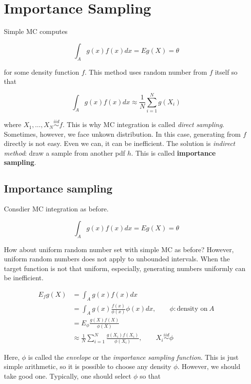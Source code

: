 \documentclass[]{book}
\theoremstyle{definition}
\theoremstyle{definition}
\theoremstyle{definition}
\theoremstyle{remark}
\begin{document}
\hypertarget{importance-sampling}{%
\section{Importance Sampling}\label{importance-sampling}}

Simple MC computes

\[\int_A g(x) f(x) dx = E g(X) = \theta\]

for some density function \(f\). This method uses random number from \(f\) itself so that

\[\int_A g(x) f(x) dx \approx \frac{1}{N} \sum_{i = 1}^N g(X_i)\]

where \(X_1, \ldots, X_N \stackrel{iid}{\sim}f\). This is why MC integration is called \emph{direct sampling}. Sometimes, however, we face unkown distribution. In this case, generating from \(f\) directly is not easy. Even we can, it can be inefficient. The solution is \emph{indirect method}: draw a sample from another pdf \(h\). This is called \textbf{importance sampling}.

\hypertarget{importance-sampling-1}{%
\subsection{Importance sampling}\label{importance-sampling-1}}

Consdier MC integration as before.

\[\int_A g(x) f(x) dx = E g(X) = \theta\]

How about uniform random number set with simple MC as before? However, uniform random numbers does not apply to unbounded intervals. When the target function is not that uniform, especially, generating numbers uniformly can be inefficient.

\begin{equation}
  \begin{split}
    E_f g(X) & = \int_A g(x) f(x) dx \\
    & = \int_A g(x) \frac{f(x)}{\phi(x)}\phi(x) dx, \qquad \phi: \text{density on}\: A \\
    & = E_{\phi}\frac{g(X)f(X)}{\phi(X)} \\
    & \approx \frac{1}{N} \sum_{i = 1}^N \frac{g(X_i)f(X_i)}{\phi(X_i)}, \qquad X_i \stackrel{iid}{\sim}\phi
  \end{split}
  \label{eq:impsample}
\end{equation}

Here, \(\phi\) is called the \emph{envelope} or the \emph{importance sampling function}. This is just simple arithmetic, so it is possible to choose any density \(\phi\). However, we should take good one. Typically, one should select \(\phi\) so that
\end{document}
